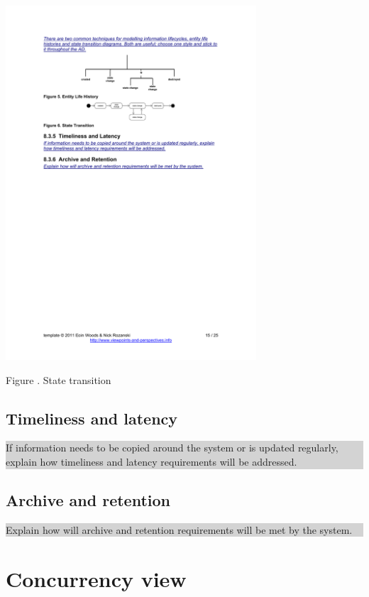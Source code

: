 \documentclass[a4paper,11pt]{report}
\newcommand{\instructions}[1]{
  \noindent\colorbox{lightgray}{%
    \parbox{\linewidth}{%
      #1
    }%
  }%
 \vspace{0.1cm}
}
\newcommand{\mycaption}[1]{
  \addtocounter{figures}{1}
  Figure \arabic{figures}. #1
}
\begin{document}
{\begin{center}
  \includegraphics[width=0.7\textwidth]{figures/statetransition}\\
  \mycaption{State transition}
\end{center}

}

\subsection{Timeliness and latency}
\label{sec:timeliness-latency}

\instructions{
If information needs to be copied around the system or is updated
regularly, explain how timeliness and latency requirements will be
addressed.
}

\subsection{Archive and retention}
\label{sec:archive-retention}

\instructions{
Explain how will archive and retention requirements will be met by the
system.
}

\section{Concurrency view}
\label{sec:concurrency-view}
\end{document}
